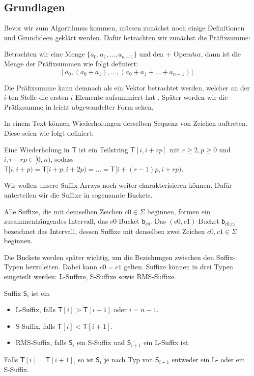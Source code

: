 \subsection{Grundlagen}
Bevor wir zum Algorithmus kommen, müssen zunächst noch einige Definitionen und Grundideen geklärt werden. Dafür betrachten wir zunächst die Präfixsumme:

\begin{definition}
	Betrachten wir eine Menge $\{a_0, a_1, \dots , a_{n-1}\}$ und den + Operator, dann ist die Menge der Präfixsummen wie folgt definiert:
	$$
	[a_0, (a_0 + a_1), \dots , (a_0 + a_1 + \dots + a_{n-1})]
	$$
\end{definition}
Die Präfixsumme kann demnach als ein Vektor betrachtet werden, welcher an der $i$-ten Stelle die ersten $i$ Elemente aufsummiert hat \cite{Blelloch90}. Später werden wir die Präfixsumme in leicht abgewandelter Form sehen.

In einem Text können Wiederholungen derselben Sequenz von Zeichen auftreten. Diese seien wie folgt definiert:
\begin{definition}
	\label{repetition}
	Eine Wiederholung in $\mathsf{T}$ ist ein Teilstring $\mathsf{T}[i, i + rp]$ mit $ r \geq 2, p \geq 0$ und $i, i + rp \in [0, n)$, sodass $\mathsf{T}[i, i+p) = \mathsf{T}[i + p, i + 2p) = \dots = \mathsf{T}[i + (r-1)p, i + rp)$.
\end{definition}

Wir wollen unsere Suffix-Arrays noch weiter charakterisieren können. Dafür unterteilen wir die Suffixe in sogenannte Buckets.

\begin{definition}
	Alle Suffixe, die mit demselben Zeichen $c0 \in \Sigma$ beginnen, formen ein zusammenhängendes Intervall, das $c0$-Bucket $\mathsf{b}_{\textit{c0}}$. Das $(c0,c1)$-Bucket $\mathsf{b}_{\textit{c0,c1}}$ bezeichnet das Intervall, dessen Suffixe mit denselben zwei Zeichen $c0,c1 \in \Sigma$ beginnen.
\end{definition}

Die Buckets werden später wichtig, um die Beziehungen zwischen den Suffix-Typen herzuleiten. Dabei kann $c0=c1$ gelten. Suffixe können in drei Typen eingeteilt werden: L-Suffixe, S-Suffixe sowie RMS-Suffixe.

\begin{definition}
	Suffix $\mathsf{S}_i$ ist ein
	\begin{itemize}
		\item L-Suffix, falls $\mathsf{T}[i] > \mathsf{T}[i+1]$ oder $i=n-1$.
		\item S-Suffix, falls $\mathsf{T}[i] < \mathsf{T}[i+1]$.
		\item RMS-Suffix, falls $\mathsf{S}_i$ ein S-Suffix und $\mathsf{S}_{i+1}$ ein L-Suffix ist.
	\end{itemize}
	Falls $\mathsf{T}[i] = \mathsf{T}[i+1]$, so ist $\mathsf{S}_i$ je nach Typ von $\mathsf{S}_{i+1}$ entweder ein L- oder ein S-Suffix.
\end{definition}

